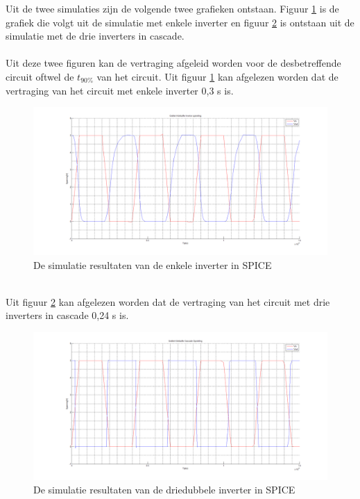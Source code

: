 
Uit de twee simulaties zijn de volgende twee grafieken ontstaan. Figuur \ref{E1} is de grafiek die volgt uit de simulatie met enkele inverter en figuur \ref{E2} is ontstaan uit de simulatie met de drie inverters in cascade.
\\
\\
Uit deze twee figuren kan de vertraging afgeleid worden voor de desbetreffende circuit oftwel de $t_{90\%}$ van het circuit. Uit figuur \ref{E1} kan afgelezen worden dat de vertraging van het circuit met enkele inverter 0,3 s is. 
\begin{figure} [h!]
\centering
\includegraphics [width = \textwidth] {inputfiles/GrafiekInverter}
\caption{De simulatie resultaten van de enkele inverter in SPICE}
\label{E1}
\end{figure}
\\
Uit figuur \ref{E2} kan afgelezen worden dat de vertraging van het circuit met drie inverters in cascade 0,24 s is.

\begin{figure} [h!]
\centering
\includegraphics [width = \textwidth] {inputfiles/GrafiekCascade}
\caption{De simulatie resultaten van de driedubbele inverter in SPICE}
\label{E2}
\end{figure}


